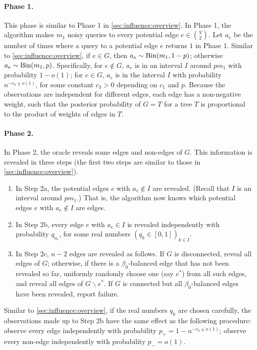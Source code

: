 \paragraph{Phase 1.}
This phase is similar to Phase 1 in \cref{sec:influence:overview}.
In Phase 1, the algorithm makes $m_1$ noisy queries to every potential edge $e\in \binom V2$.
Let $a_e$ be the number of times where a query to a potential edge $e$ returns $1$ in Phase 1.
Similar to \cref{sec:influence:overview}, if $e\in G$, then $a_e \sim \operatorname{\mathrm{Bin}}(m_1, 1-p)$; otherwise $a_e \sim \operatorname{\mathrm{Bin}}(m_1, p)$.
Specifically, for $e\not \in G$, $a_e$ is in an interval $I$ around $p m_1$ with probability $1-o(1)$; for $e\in G$, $a_e$ is in the interval $I$ with probability $n^{-c_3\pm o(1)}$, for some constant $c_3>0$ depending on $c_1$ and $p$.
Because the observations are independent for different edges, each edge has a non-negative weight, such that the posterior probability of $G=T$ for a tree $T$ is proportional to the product of weights of edges in $T$.

\paragraph{Phase 2.}
In Phase 2, the oracle reveals some edges and non-edges of $G$.
This information is revealed in three steps (the first two steps are similar to those in \cref{sec:influence:overview}).
\begin{enumerate}[label=2\alph*.]
  \item \label{item:sec:conn:overview:step-2a} In Step 2a, the potential edges $e$ with $a_e \not \in I$ are revealed. (Recall that $I$ is an interval around $p m_1$.) That is, the algorithm now knows which potential edges $e$ with $a_e \not \in I$ are edges.
  \item \label{item:sec:conn:overview:step-2b} In Step 2b, every edge $e$ with $a_e\in I$ is revealed independently with probability $q_{a_e}$, for some real numbers $(q_k\in [0,1])_{k\in I}$.
  \item \label{item:sec:conn:overview:step-2c} In Step 2c, $n-2$ edges are revealed as follows.
  If $G$ is disconnected, reveal all edges of $G$; otherwise, if there is a $\beta_0$-balanced edge that has not been revealed so far, uniformly randomly choose one (say $e^*$) from all such edges, and reveal all edges of $G\backslash e^*$. If $G$ is connected but all $\beta_0$-balanced edges have been revealed, report failure.
\end{enumerate}

Similar to \cref{sec:influence:overview}, if the real numbers $q_k$ are chosen carefully, the observations made up to Step 2b have the same effect as the following procedure: observe every edge independently with probability $p_+=1-n^{-c_3\pm o(1)}$; observe every non-edge independently with probability $p_-=o(1)$.



